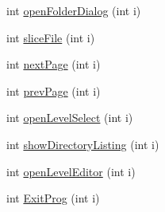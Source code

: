 \begin{DoxyCompactItemize}
$$\item 
int \hyperlink{group___core_gae327268c8424aa3cb6cea07ea33a3019}{open\+Folder\+Dialog} (int i)
\item 
int \hyperlink{group___core_ga3c412437d5338d1b9242ca728ec3fa6a}{slice\+File} (int i)
\item 
int \hyperlink{group___core_ga26169da7eb509dc305939ffabf06ac58}{next\+Page} (int i)
\item 
int \hyperlink{group___core_ga8f29a9074178aa050d1938014a4d9d5b}{prev\+Page} (int i)
\item 
int \hyperlink{group___core_ga6851f8613954858f5ed67795db823076}{open\+Level\+Select} (int i)
\item 
int \hyperlink{group___core_ga70bec60930d92e442620c4cbe2232606}{show\+Directory\+Listing} (int i)
\item 
int \hyperlink{group___core_ga38f3d65c215c1ab12f47b8aa9dfe4cc5}{open\+Level\+Editor} (int i)
\item 
int \hyperlink{group___core_gac66e8a197a47d63d439a2b34a23d1444}{Exit\+Prog} (int i)
\end{DoxyCompactItemize}
